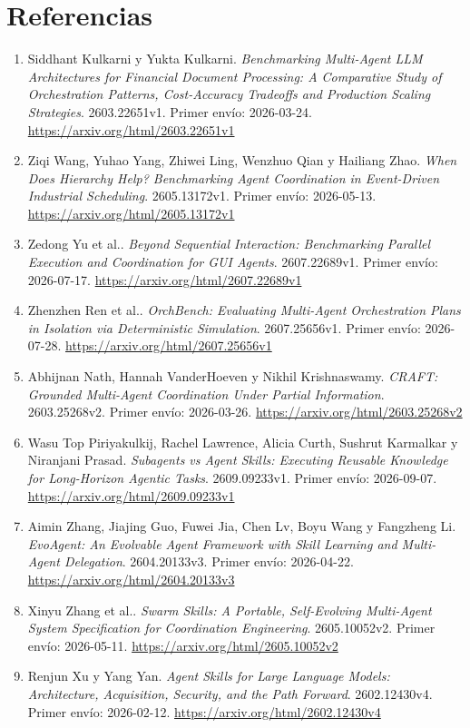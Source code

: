 \clearpage
\section*{Referencias}
\begingroup\small
\begin{enumerate}
\item Siddhant Kulkarni y Yukta Kulkarni. \textit{Benchmarking Multi-Agent LLM Architectures for Financial Document Processing: A Comparative Study of Orchestration Patterns, Cost-Accuracy Tradeoffs and Production Scaling Strategies}. 2603.22651v1. Primer envío: 2026-03-24. \url{https://arxiv.org/html/2603.22651v1}
\item Ziqi Wang, Yuhao Yang, Zhiwei Ling, Wenzhuo Qian y Hailiang Zhao. \textit{When Does Hierarchy Help? Benchmarking Agent Coordination in Event-Driven Industrial Scheduling}. 2605.13172v1. Primer envío: 2026-05-13. \url{https://arxiv.org/html/2605.13172v1}
\item Zedong Yu et al.. \textit{Beyond Sequential Interaction: Benchmarking Parallel Execution and Coordination for GUI Agents}. 2607.22689v1. Primer envío: 2026-07-17. \url{https://arxiv.org/html/2607.22689v1}
\item Zhenzhen Ren et al.. \textit{OrchBench: Evaluating Multi-Agent Orchestration Plans in Isolation via Deterministic Simulation}. 2607.25656v1. Primer envío: 2026-07-28. \url{https://arxiv.org/html/2607.25656v1}
\item Abhijnan Nath, Hannah VanderHoeven y Nikhil Krishnaswamy. \textit{CRAFT: Grounded Multi-Agent Coordination Under Partial Information}. 2603.25268v2. Primer envío: 2026-03-26. \url{https://arxiv.org/html/2603.25268v2}
\item Wasu Top Piriyakulkij, Rachel Lawrence, Alicia Curth, Sushrut Karmalkar y Niranjani Prasad. \textit{Subagents vs Agent Skills: Executing Reusable Knowledge for Long-Horizon Agentic Tasks}. 2609.09233v1. Primer envío: 2026-09-07. \url{https://arxiv.org/html/2609.09233v1}
\item Aimin Zhang, Jiajing Guo, Fuwei Jia, Chen Lv, Boyu Wang y Fangzheng Li. \textit{EvoAgent: An Evolvable Agent Framework with Skill Learning and Multi-Agent Delegation}. 2604.20133v3. Primer envío: 2026-04-22. \url{https://arxiv.org/html/2604.20133v3}
\item Xinyu Zhang et al.. \textit{Swarm Skills: A Portable, Self-Evolving Multi-Agent System Specification for Coordination Engineering}. 2605.10052v2. Primer envío: 2026-05-11. \url{https://arxiv.org/html/2605.10052v2}
\item Renjun Xu y Yang Yan. \textit{Agent Skills for Large Language Models: Architecture, Acquisition, Security, and the Path Forward}. 2602.12430v4. Primer envío: 2026-02-12. \url{https://arxiv.org/html/2602.12430v4}

\end{enumerate}
